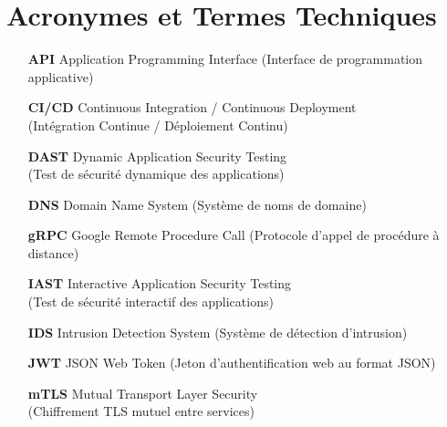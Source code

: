 
\chapter*{Acronymes et Termes Techniques}

\begin{itemize}[leftmargin=2cm, labelwidth=1.8cm, align=left, itemsep=4pt]

  \item[\textbf{API}] Application Programming Interface (Interface de programmation applicative)

  \item[\textbf{CI/CD}] Continuous Integration / Continuous Deployment\\
        (Intégration Continue / Déploiement Continu)

  \item[\textbf{DAST}] Dynamic Application Security Testing\\
        (Test de sécurité dynamique des applications)

  \item[\textbf{DNS}] Domain Name System (Système de noms de domaine)

  \item[\textbf{gRPC}] Google Remote Procedure Call (Protocole d'appel de procédure à distance)

  \item[\textbf{IAST}] Interactive Application Security Testing\\
        (Test de sécurité interactif des applications)

  \item[\textbf{IDS}] Intrusion Detection System (Système de détection d'intrusion)

  \item[\textbf{JWT}] JSON Web Token (Jeton d'authentification web au format JSON)

  \item[\textbf{mTLS}] Mutual Transport Layer Security\\
        (Chiffrement TLS mutuel entre services)


\end{itemize}
